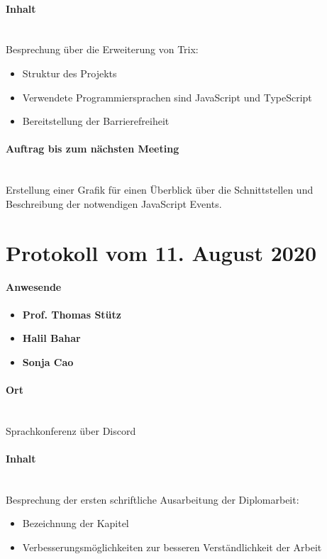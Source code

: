 \paragraph{Inhalt}\mbox{}\\
Besprechung über die Erweiterung von Trix:
\begin{itemize}
	\item{Struktur des Projekts}
	\item{Verwendete Programmiersprachen sind JavaScript und TypeScript}
	\item{Bereitstellung der Barrierefreiheit}
\end{itemize}

\paragraph{Auftrag bis zum nächsten Meeting}\mbox{}\\
Erstellung einer Grafik für einen Überblick über die Schnittstellen und Beschreibung der notwendigen JavaScript Events.

\section{Protokoll vom 11. August 2020}

\paragraph{Anwesende}
\begin{itemize}
	\item{\textbf{Prof. Thomas Stütz}}
	\item{\textbf{Halil Bahar}}
	\item{\textbf{Sonja Cao}}
\end{itemize}

\paragraph{Ort}\mbox{}\\
Sprachkonferenz über Discord

\paragraph{Inhalt}\mbox{}\\
Besprechung der ersten schriftliche Ausarbeitung der Diplomarbeit:
\begin{itemize}
	\item{Bezeichnung der Kapitel}
	\item{Verbesserungsmöglichkeiten zur besseren Verständlichkeit der Arbeit}
\end{itemize}

